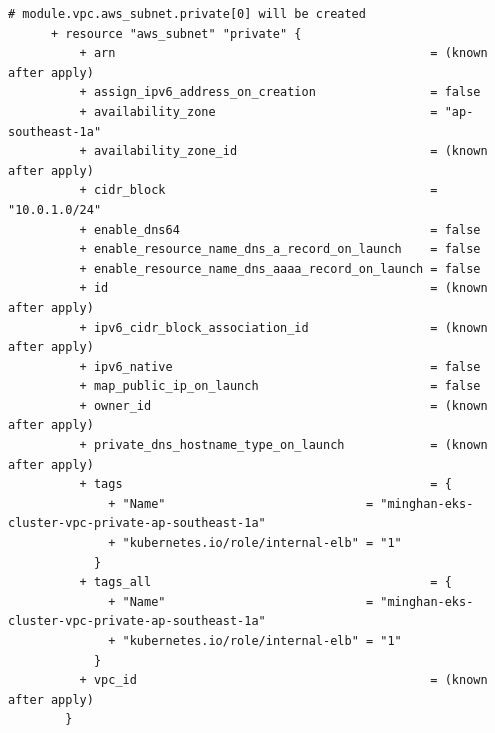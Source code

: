 \begin{lstlisting}[caption={terraform plan output for \texttt{cloudkube} provisioning}, breaklines=true, breakatwhitespace=false]
      # module.vpc.aws_subnet.private[0] will be created
      + resource "aws_subnet" "private" {
          + arn                                            = (known after apply)
          + assign_ipv6_address_on_creation                = false
          + availability_zone                              = "ap-southeast-1a"
          + availability_zone_id                           = (known after apply)
          + cidr_block                                     = "10.0.1.0/24"
          + enable_dns64                                   = false
          + enable_resource_name_dns_a_record_on_launch    = false
          + enable_resource_name_dns_aaaa_record_on_launch = false
          + id                                             = (known after apply)
          + ipv6_cidr_block_association_id                 = (known after apply)
          + ipv6_native                                    = false
          + map_public_ip_on_launch                        = false
          + owner_id                                       = (known after apply)
          + private_dns_hostname_type_on_launch            = (known after apply)
          + tags                                           = {
              + "Name"                            = "minghan-eks-cluster-vpc-private-ap-southeast-1a"
              + "kubernetes.io/role/internal-elb" = "1"
            }
          + tags_all                                       = {
              + "Name"                            = "minghan-eks-cluster-vpc-private-ap-southeast-1a"
              + "kubernetes.io/role/internal-elb" = "1"
            }
          + vpc_id                                         = (known after apply)
        }
    

\end{lstlisting}
